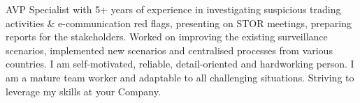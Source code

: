 AVP Specialist with 5+ years of experience in investigating suspicious trading activities \& e-communication red flags, presenting on STOR meetings, preparing reports for the stakeholders.
Worked on improving the existing surveillance scenarios, implemented new scenarios and centralised processes from various countries.
I am self-motivated, reliable, detail-oriented and hardworking person.
I am a mature team worker and adaptable to all challenging situations.
Striving to leverage my skills at your Company.

